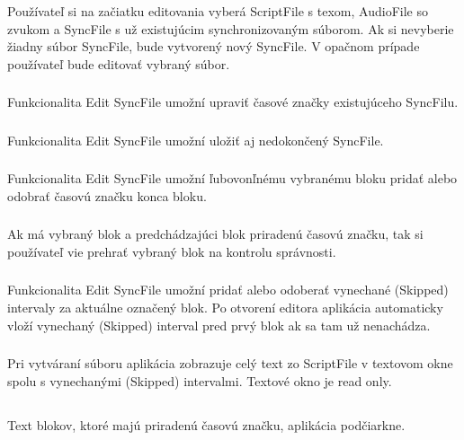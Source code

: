 \documentclass{article}
\begin{document}
\subsubsection{}
Používateľ si na začiatku editovania vyberá ScriptFile s texom, AudioFile so zvukom a SyncFile s už existujúcim synchronizovaným súborom. Ak si nevyberie žiadny súbor SyncFile, bude vytvorený nový SyncFile. V opačnom prípade používateľ bude editovať vybraný súbor.

\subsubsection{}
Funkcionalita Edit SyncFile umožní upraviť časové značky existujúceho SyncFilu.

\subsubsection{}
Funkcionalita Edit SyncFile umožní uložiť aj nedokončený SyncFile.

\subsubsection{}
Funkcionalita Edit SyncFile umožní ľubovonľnému vybranému bloku pridať alebo odobrať časovú značku konca bloku. 

\subsubsection{}
Ak má vybraný blok a predchádzajúci blok priradenú časovú značku, tak si používateľ vie prehrať vybraný blok na kontrolu správnosti.

\subsubsection{}
Funkcionalita Edit SyncFile umožní pridať alebo odoberať vynechané (Skipped) intervaly za aktuálne označený blok. Po otvorení editora aplikácia automaticky vloží vynechaný (Skipped) interval pred prvý blok ak sa tam už nenachádza.

\subsubsection{}
Pri vytváraní súboru aplikácia zobrazuje celý text zo ScriptFile v textovom okne spolu s vynechanými (Skipped) intervalmi. Textové okno je read only.

\subsection{}
Text blokov, ktoré majú priradenú časovú značku, aplikácia podčiarkne. 
\end{document}
